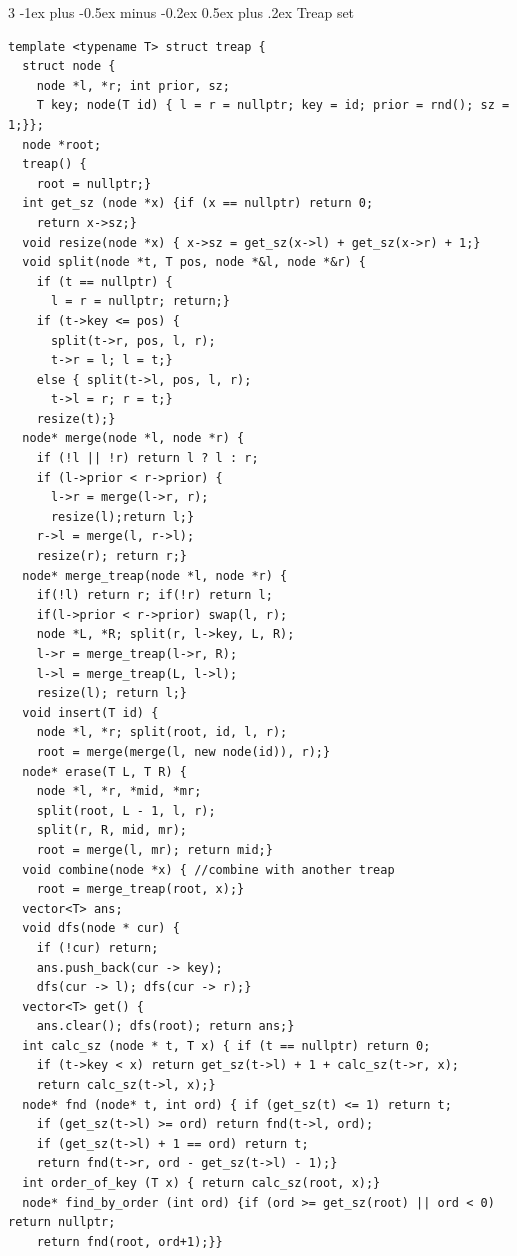 \documentclass[8pt,a4paper,onesided]{article}
\makeatletter
\renewcommand{\subsection}{\@startsection{subsection}{2}{0mm}
    {-1ex plus -0.5ex minus -0.2ex} %
    {0.5ex plus .2ex}                %
    {\normalfont\large\bfseries}}    %
\makeatother
\begin{document}
\begin{multicols}{3}
\subsection{Treap set}
\begin{verbatim}
template <typename T> struct treap {
  struct node {
    node *l, *r; int prior, sz;
    T key; node(T id) { l = r = nullptr; key = id; prior = rnd(); sz = 1;}};
  node *root;
  treap() {
    root = nullptr;}
  int get_sz (node *x) {if (x == nullptr) return 0;
    return x->sz;}
  void resize(node *x) { x->sz = get_sz(x->l) + get_sz(x->r) + 1;}
  void split(node *t, T pos, node *&l, node *&r) {
    if (t == nullptr) {
      l = r = nullptr; return;}
    if (t->key <= pos) {
      split(t->r, pos, l, r);
      t->r = l; l = t;}
    else { split(t->l, pos, l, r);
      t->l = r; r = t;}
    resize(t);}
  node* merge(node *l, node *r) {
    if (!l || !r) return l ? l : r;
    if (l->prior < r->prior) {
      l->r = merge(l->r, r);
      resize(l);return l;}
    r->l = merge(l, r->l);
    resize(r); return r;}
  node* merge_treap(node *l, node *r) {
    if(!l) return r; if(!r) return l;
    if(l->prior < r->prior) swap(l, r);
    node *L, *R; split(r, l->key, L, R);
    l->r = merge_treap(l->r, R);
    l->l = merge_treap(L, l->l);
    resize(l); return l;}
  void insert(T id) {
    node *l, *r; split(root, id, l, r);
    root = merge(merge(l, new node(id)), r);}
  node* erase(T L, T R) {
    node *l, *r, *mid, *mr;
    split(root, L - 1, l, r);
    split(r, R, mid, mr);
    root = merge(l, mr); return mid;}
  void combine(node *x) { //combine with another treap
    root = merge_treap(root, x);}
  vector<T> ans;
  void dfs(node * cur) {
    if (!cur) return;
    ans.push_back(cur -> key);
    dfs(cur -> l); dfs(cur -> r);}
  vector<T> get() {
    ans.clear(); dfs(root); return ans;}
  int calc_sz (node * t, T x) { if (t == nullptr) return 0;
    if (t->key < x) return get_sz(t->l) + 1 + calc_sz(t->r, x);
    return calc_sz(t->l, x);}
  node* fnd (node* t, int ord) { if (get_sz(t) <= 1) return t;
    if (get_sz(t->l) >= ord) return fnd(t->l, ord);
    if (get_sz(t->l) + 1 == ord) return t;
    return fnd(t->r, ord - get_sz(t->l) - 1);}
  int order_of_key (T x) { return calc_sz(root, x);}
  node* find_by_order (int ord) {if (ord >= get_sz(root) || ord < 0) return nullptr;
    return fnd(root, ord+1);}}
\end{verbatim}

\end{multicols}
\end{document}

